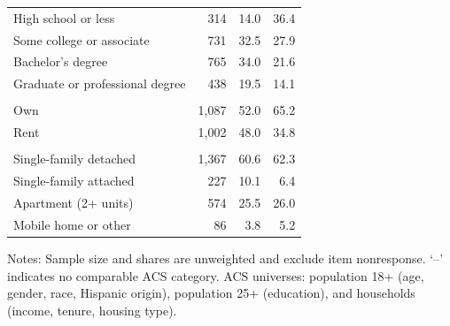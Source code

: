 \begin{table}[pos=H]
\begin{tabular}{lrrr}
\quad High school or less & 314 & 14.0 & 36.4 \\
\quad Some college or associate & 731 & 32.5 & 27.9 \\
\quad Bachelor's degree & 765 & 34.0 & 21.6 \\
\quad Graduate or professional degree & 438 & 19.5 & 14.1 \\
\addlinespace[2pt]
\multicolumn{4}{l}{\textit{Housing tenure}} \\
\quad Own & 1,087 & 52.0 & 65.2 \\
\quad Rent & 1,002 & 48.0 & 34.8 \\
\addlinespace[2pt]
\multicolumn{4}{l}{\textit{Housing type}} \\
\quad Single-family detached & 1,367 & 60.6 & 62.3 \\
\quad Single-family attached & 227 & 10.1 & 6.4 \\
\quad Apartment (2+ units) & 574 & 25.5 & 26.0 \\
\quad Mobile home or other & 86 & 3.8 & 5.2 \\
\bottomrule
\end{tabular}
\begin{minipage}{0.8\textwidth}
\vspace{4pt}\footnotesize
Notes: Sample size and shares are unweighted and exclude item nonresponse. `--' indicates no comparable ACS category. ACS universes: population 18+ (age, gender, race, Hispanic origin), population 25+ (education), and households (income, tenure, housing type).
\end{minipage}
\end{table}


